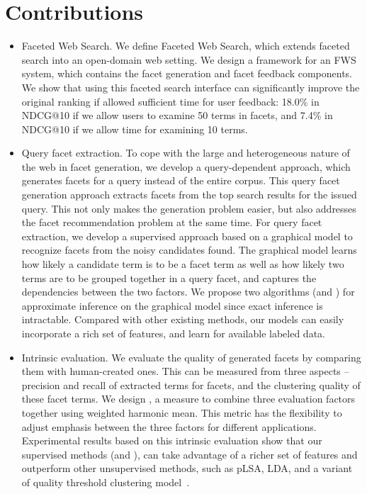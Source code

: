 \section{Contributions}
\label{sec:intro-contributions}
\begin{itemize}
 \item Faceted Web Search. We define Faceted Web Search, which extends faceted search into an open-domain web setting. We design a framework for an FWS system, which contains the facet generation and facet feedback components. We show that using this faceted search interface can significantly improve the original ranking if allowed sufficient time for user feedback: 18.0\% in NDCG@10 if we allow users to examine 50 terms in facets, and 7.4\% in NDCG@10 if we allow time for examining 10 terms.

 \item Query facet extraction. To cope with the large and heterogeneous nature of the web in facet generation, we develop a query-dependent approach, which generates facets for a query instead of the entire corpus. This query facet generation approach extracts facets from the top search results for the issued query. This not only makes the generation problem easier, but also addresses the facet recommendation problem at the same time. For query facet extraction, we develop a supervised approach based on a graphical model to recognize facets from the noisy candidates found. The graphical model learns how likely a candidate term is to be a facet term as well as how likely two terms are to be grouped together in a query facet, and captures the dependencies between the two factors. We propose two algorithms (\QFI and \QFJ) for approximate inference on the graphical model since exact inference is intractable. Compared with other existing methods, our models can easily incorporate a rich set of features, and learn 
for available labeled data.

\item Intrinsic evaluation. We evaluate the quality of generated facets by comparing them with human-created ones. This can be measured from three aspects -- precision and recall of extracted terms for facets, and the clustering quality of these facet terms. We design \PRF, a measure to combine three evaluation factors together using weighted harmonic mean. This metric has the flexibility to adjust emphasis between the three factors for different applications. Experimental results based on this intrinsic evaluation show that our supervised methods (\QFI and \QFJ), can take advantage of a richer set of features and outperform other unsupervised methods, such as pLSA, LDA, and a variant of quality threshold clustering model~\cite{dou2011finding}.


\end{itemize}
